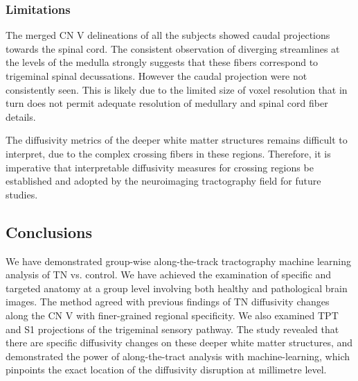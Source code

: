 \subsubsection{Limitations}
The merged CN V delineations of all the subjects showed caudal projections towards the spinal cord. The consistent observation of diverging streamlines at the levels of the medulla strongly suggests that these fibers correspond to trigeminal spinal decussations. However the caudal projection were not consistently seen. This is likely due to the limited size of voxel resolution that in turn does not permit adequate resolution of medullary and spinal cord fiber details.

The diffusivity metrics of the deeper white matter structures remains difficult to interpret, due to the complex crossing fibers in these regions. Therefore, it is imperative that interpretable diffusivity measures for crossing regions be established and adopted by the neuroimaging tractography field for future studies. 

\subsection{Conclusions}
We have demonstrated group-wise along-the-track tractography machine learning analysis of TN vs. control. We have achieved the examination of specific and targeted anatomy at a group level involving both healthy and pathological brain images. The method agreed with previous findings of TN diffusivity changes along the CN V with finer-grained regional specificity. We also examined TPT and S1 projections of the trigeminal sensory pathway. The study revealed that there are specific diffusivity changes on these deeper white matter structures, and demonstrated the power of along-the-tract analysis with machine-learning, which pinpoints the exact location of the diffusivity disruption at millimetre level. 
